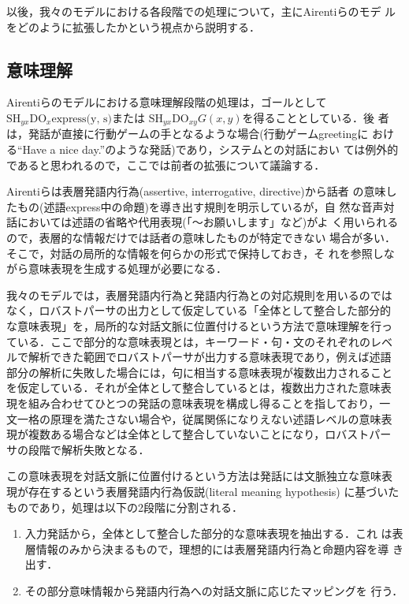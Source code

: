 以後，我々のモデルにおける各段階での処理について，主にAirentiらのモデ
ルをどのように拡張したかという視点から説明する．

\subsection{意味理解}

Airentiらのモデルにおける意味理解段階の処理は，ゴールとして
$\mbox{SH}_{yx}\mbox{DO}_x \mbox{express(y, s)}$または
$\mbox{SH}_{yx}\mbox{DO}_{xy} G(x,y)$を得ることとしている．後
者は，発話が直接に行動ゲームの手となるような場合(行動ゲームgreetingに
おける``Have a nice day.''のような発話)であり，システムとの対話におい
ては例外的であると思われるので，ここでは前者の拡張について議論する．

Airentiらは表層発語内行為(assertive, interrogative, directive)から話者
の意味したもの(述語express中の命題)を導き出す規則を明示しているが，自
然な音声対話においては述語の省略や代用表現(「〜お願いします」など)がよ
く用いられるので，表層的な情報だけでは話者の意味したものが特定できない
場合が多い．そこで，対話の局所的な情報を何らかの形式で保持しておき，そ
れを参照しながら意味表現を生成する処理が必要になる．

我々のモデルでは，表層発語内行為と発語内行為との対応規則を用いるのでは
なく，ロバストパーサの出力として仮定している「全体として整合した部分的
な意味表現」を，局所的な対話文脈に位置付けるという方法で意味理解を行っ
ている．ここで部分的な意味表現とは，キーワード・句・文のそれぞれのレベ
ルで解析できた範囲でロバストパーサが出力する意味表現であり，例えば述語
部分の解析に失敗した場合には，句に相当する意味表現が複数出力されること
を仮定している．それが全体として整合しているとは，複数出力された意味表
現を組み合わせてひとつの発話の意味表現を構成し得ることを指しており，一
文一格の原理を満たさない場合や，従属関係になりえない述語レベルの意味表
現が複数ある場合などは全体として整合していないことになり，ロバストパー
サの段階で解析失敗となる．

この意味表現を対話文脈に位置付けるという方法は発話には文脈独立な意味表
現が存在するという表層発語内行為仮説(literal meaning hypothesis)
\cite{allen95}に基づいたものであり，処理は以下の2段階に分割される．

\begin{enumerate}
\item 入力発話から，全体として整合した部分的な意味表現を抽出する．これ
は表層情報のみから決まるもので，理想的には表層発語内行為と命題内容を導
き出す．
\item その部分意味情報から発語内行為への対話文脈に応じたマッピングを
行う．
\end{enumerate}


